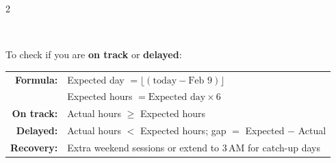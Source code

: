 \documentclass[a3paper,landscape]{article}
\begin{document}
\begin{multicols}{2}
\vspace{0.5cm}

\\[4pt]
{\small
To check if you are \textbf{on track} or \textbf{delayed}:\\[3pt]
\begin{tabular}{@{}r l@{}}
\textbf{Formula:} & Expected day $= \lfloor(\text{today} - \text{Feb 9}) \rfloor$ \\
                   & Expected hours $= \text{Expected day} \times 6$ \\[3pt]
\textbf{On track:} & Actual hours $\geq$ Expected hours \\
\textbf{Delayed:}   & Actual hours $<$ Expected hours; gap $=$ Expected $-$ Actual \\
\textbf{Recovery:}  & Extra weekend sessions or extend to 3\,AM for catch-up days \\
\end{tabular}
}

\end{multicols}
\end{document}
